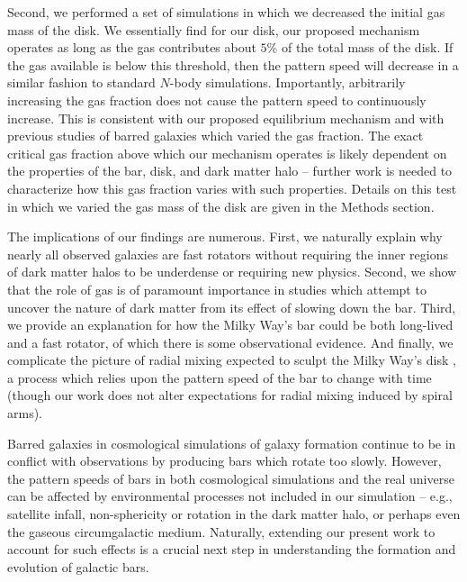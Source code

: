 \documentclass{natureprintstyle}
\newcommand{\Nbody}{$N$-body}
\begin{document}
Second, we performed a set of simulations in which we decreased the initial
gas mass of the disk. We essentially find for our disk, our proposed mechanism
operates as long as the gas contributes about $5\%$ of the total mass of the
disk. If the gas available is below this threshold, then the pattern speed
will decrease in a similar fashion to standard \Nbody{} simulations.
Importantly, arbitrarily increasing the gas fraction does not cause the
pattern speed to continuously increase. This is consistent with our proposed
equilibrium mechanism and with previous studies of barred galaxies which
varied the gas fraction.\cite{2010ApJ...719.1470V} The exact critical gas
fraction above which our mechanism operates is likely dependent on the
properties of the bar, disk, and dark matter halo -- further work is needed to
characterize how this gas fraction varies with such properties. Details on
this test in which we varied the gas mass of the disk are given in the Methods
section.

The implications of our findings are numerous. First, we naturally explain why
nearly all observed galaxies are fast rotators without requiring the inner
regions of dark matter halos to be underdense\cite{1998ApJ...493L...5D,
2000ApJ...543..704D} or requiring new physics.\cite{2021MNRAS.503.2833R,
2021MNRAS.508..926R} Second, we show that the role of gas is of paramount
importance in studies which attempt to uncover the nature of dark matter from
its effect of slowing down the bar.\cite{2021MNRAS.500.4710C,
2021MNRAS.505.2412C} Third, we provide an explanation for how the Milky Way's
bar could be both long-lived and a fast rotator, of which there is some
observational evidence.\cite{2019MNRAS.490.4740B} And finally, we complicate
the picture of radial mixing expected to sculpt the Milky Way's disk
\cite{2012MNRAS.420..913B, 2015ApJ...808..132H}, a process which relies upon
the pattern speed of the bar to change with time (though our work does not
alter expectations for radial mixing induced by spiral
arms\cite{2002MNRAS.336..785S}).

Barred galaxies in cosmological simulations of galaxy formation continue to be
in conflict with observations by producing bars which rotate too
slowly.\cite{2017MNRAS.469.1054A, 2019MNRAS.483.2721P, 2021AA...650L..16F}
However, the pattern speeds of bars in both cosmological simulations and the
real universe can be affected by environmental processes not included in our
simulation -- e.g., satellite infall\cite{2011Natur.477..301P},
non-sphericity\cite{2013MNRAS.429.1949A} or rotation\cite{2013MNRAS.434.1287S,
2014ApJ...783L..18L, 2018MNRAS.476.1331C, 2019MNRAS.488.5788C} in the dark
matter halo, or perhaps even the gaseous circumgalactic medium. Naturally,
extending our present work to account for such effects is a crucial next step
in understanding the formation and evolution of galactic bars.
\end{document}
